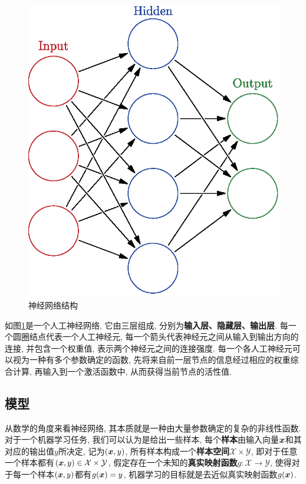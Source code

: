 \documentclass[12pt, a4paper, oneside]{ctexart}
\begin{document}
\begin{figure}
    \centering
    \label{figure-神经网络}
    \includegraphics[scale=0.7]{neural_network.eps}
    \caption{神经网络结构\protect\footnotemark[1]}
\end{figure}

如图\ref{figure-神经网络}是一个人工神经网络, 它由三层组成, 分别为\textbf{输入层、隐藏层、输出层}. 每一个圆圈结点代表一个人工神经元, 每一个箭头代表神经元之间从输入到输出方向的连接, 并包含一个权重值, 表示两个神经元之间的连接强度. 每一个各人工神经元可以视为一种有多个参数确定的函数, 先将来自前一层节点的信息经过相应的权重综合计算, 再输入到一个激活函数中, 从而获得当前节点的活性值.

\subsection{模型}

从数学的角度来看神经网络, 其本质就是一种由大量参数确定的复杂的非线性函数. 对于一个机器学习任务, 我们可以认为是给出一些样本, 每个\textbf{样本}由输入向量$\boldsymbol{x}$和其对应的输出值$y$所决定, 记为$(\boldsymbol{x}, y)$, 所有样本构成一个\textbf{样本空间}$\mathcal{X}\times \mathcal{Y}$, 即对于任意一个样本都有$(\boldsymbol{x},y)\in \mathcal{X}\times\mathcal{Y}$, 假定存在一个未知的\textbf{真实映射函数}$g:\mathcal{X}\rightarrow \mathcal{Y}$, 使得对于每一个样本$(\boldsymbol{x}, y)$都有$g(\boldsymbol{x}) = y$, 机器学习的目标就是去近似真实映射函数$g(\boldsymbol{x})$.
\end{document}
